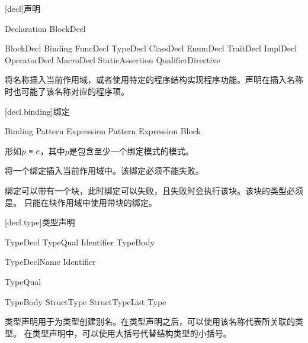 
[decl]{声明}

\begin{bnf}{Declaration}
    BlockDecl
\end{bnf}

\begin{bnf}{BlockDecl}
    Binding \br
    FuncDecl \br
    TypeDecl \br
    ClassDecl \br
    EnumDecl \br
    TraitDecl \br
    ImplDecl \br
    OperatorDecl \br
    MacroDecl \br
    StaticAssertion \br
    QualifierDirective
\end{bnf}

\pnum
{}将名称插入当前作用域，或者使用特定的程序结构实现程序功能。声明在插入名称时也可能了该名称对应的程序项。

[decl.binding]{绑定}

\begin{bnf}{Binding}
    Pattern \terminal{=} Expression \terminal{;} \br
    Pattern \terminal{=} Expression  Block
\end{bnf}

\pnum
{}形如$p\ \tcode{=}\ e$，其中$p$是包含至少一个绑定模式的模式。

\pnum
{}将一个绑定插入当前作用域中。该绑定必须不能失败。

\pnum
绑定可以带有一个块，此时绑定可以失败，且失败时会执行该块。该块的类型必须是。
只能在块作用域中使用带块的绑定。

[decl.type]{类型声明}

\begin{bnf}{TypeDecl}
    TypeQual\bnfs {} Identifier TypeBody
\end{bnf}

\begin{bnf}{TypeDeclName}
    Identifier \br
\end{bnf}

\begin{bnf}{TypeQual}
\end{bnf}

\begin{bnf}{TypeBody}
    StructType \br
    \terminal{\{} \terminal{\}} \br
    \terminal{\{} StructTypeList \terminal{,}\bnfq \terminal{\}} \br
    \terminal{=} Type
\end{bnf}

\pnum
类型声明用于为类型创建别名。在类型声明之后，可以使用该名称代表所关联的类型。
在类型声明中，可以使用大括号代替结构类型的小括号。

